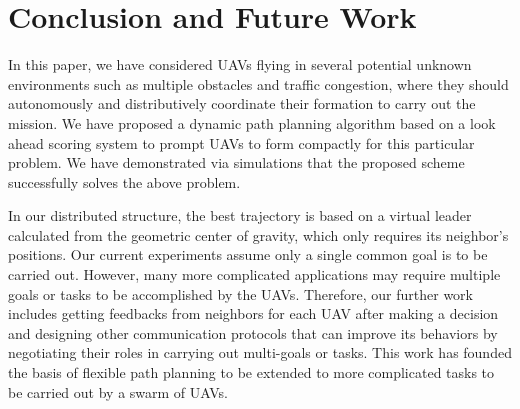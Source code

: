 \chapter{Conclusion and Future Work}

In this paper, we have considered UAVs flying in several potential unknown environments such as multiple obstacles and traffic congestion, where they should autonomously and distributively coordinate their formation to carry out the mission. We have proposed a dynamic path planning algorithm based on a look ahead scoring system to prompt UAVs to form compactly for this particular problem. We have demonstrated via simulations that the proposed scheme successfully solves the above problem. 

In our distributed structure, the best trajectory is based on a virtual leader calculated from the geometric center of gravity, which only requires its neighbor's positions. Our current experiments assume only a single common goal is to be carried out. However, many more complicated applications may require multiple goals or tasks to be accomplished by the UAVs. Therefore, our further work includes getting feedbacks from neighbors for each UAV after making a decision and designing other communication protocols that can improve its behaviors by negotiating their roles in carrying out multi-goals or tasks. This work has founded the basis of flexible path planning to be extended to more complicated tasks to be carried out by a swarm of UAVs.





